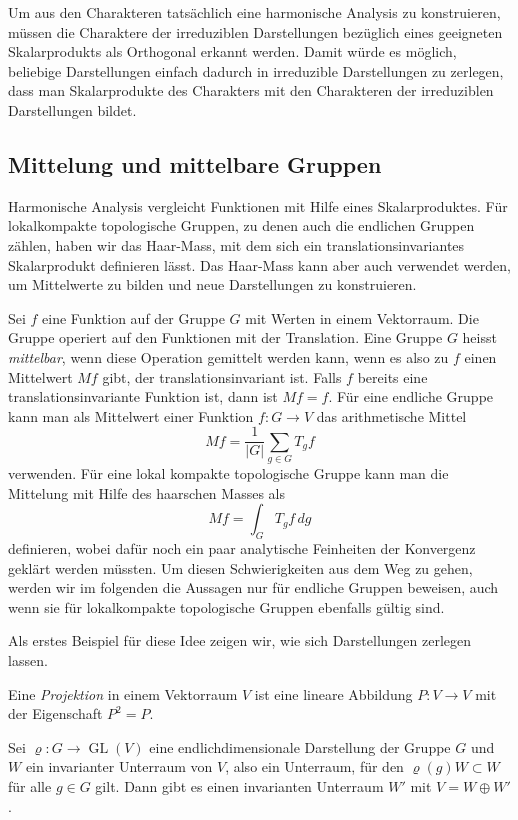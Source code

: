 Um aus den Charakteren tatsächlich eine harmonische Analysis zu konstruieren,
müssen die Charaktere der irreduziblen Darstellungen bezüglich eines
geeigneten Skalarprodukts als Orthogonal erkannt werden.
Damit würde es möglich, beliebige Darstellungen einfach dadurch in
irreduzible Darstellungen zu zerlegen, dass man Skalarprodukte des
Charakters mit den Charakteren der irreduziblen Darstellungen bildet.

%
%
\subsection{Mittelung und mittelbare Gruppen}
Harmonische Analysis vergleicht Funktionen mit Hilfe eines Skalarproduktes.
Für lokalkompakte topologische Gruppen, zu denen auch die endlichen Gruppen
zählen, haben wir das Haar-Mass, mit dem sich ein translationsinvariantes
Skalarprodukt definieren lässt.
Das Haar-Mass kann aber auch verwendet werden, um Mittelwerte zu bilden
und neue Darstellungen zu konstruieren.

Sei $f$ eine Funktion auf der Gruppe $G$ mit Werten in einem Vektorraum.
Die Gruppe operiert auf den Funktionen mit der Translation.
Eine Gruppe $G$ heisst {\em mittelbar}, wenn diese Operation gemittelt
werden kann, wenn es also zu $f$ einen Mittelwert $Mf$ gibt, der 
translationsinvariant ist.
Falls $f$ bereits eine translationsinvariante Funktion ist, dann 
ist $Mf=f$.
Für eine endliche Gruppe kann man als Mittelwert einer Funktion
$f\colon G\to V$ das arithmetische Mittel
\[
Mf
=
\frac{1}{|G|}
\sum_{g\in G} T_gf
\]
verwenden.
Für eine lokal kompakte topologische Gruppe kann man die Mittelung
mit Hilfe des haarschen Masses als
\[
Mf
=
\int_G T_gf\,dg
\]
definieren, wobei dafür noch ein paar analytische Feinheiten der
Konvergenz geklärt werden müssten.
Um diesen Schwierigkeiten aus dem Weg zu gehen, werden wir im folgenden
die Aussagen nur für endliche Gruppen beweisen, auch wenn sie für
lokalkompakte topologische Gruppen ebenfalls gültig sind.

Als erstes Beispiel für diese Idee zeigen wir, wie sich Darstellungen 
zerlegen lassen.

\begin{definition}
\label{buch:gruppen:darstellungen:def:projektion}
Eine {\em Projektion} in einem Vektorraum $V$ ist eine lineare Abbildung
$P\colon V\to V$ mit der Eigenschaft $P^2=P$.
\end{definition}

\begin{satz}
\label{buch:gruppen:darstellungen:satz:projektion}
Sei $\varrho\colon G\to\operatorname{GL}(V)$  eine endlichdimensionale
Darstellung der Gruppe $G$ und $W$ ein invarianter Unterraum von $V$,
also ein Unterraum, für den $\varrho(g)W\subset W$ für alle $g\in G$ gilt.
Dann gibt es einen invarianten Unterraum $W'$ mit $V=W\oplus W'$.
\end{satz}

